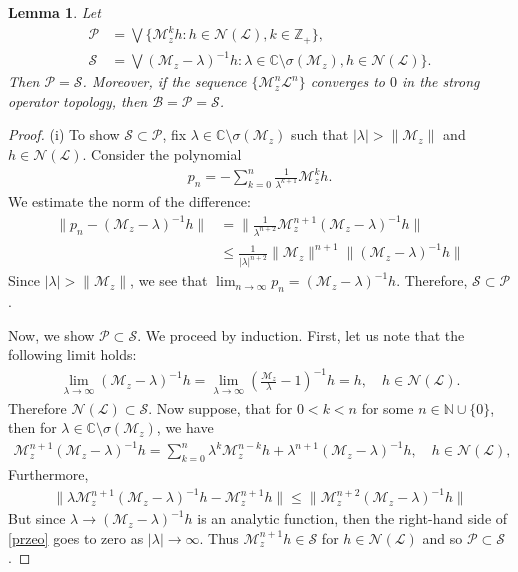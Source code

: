 \documentclass[reqno]{amsproc}
\numberwithin{equation}{section}
\newtheorem{lemma}[theorem]{Lemma}
\theoremstyle{remark}
\newcommand*{\natu}{\mathbb{N}}
\newcommand*{\nul}{\mathscr{N}}
\newcommand*{\comp}{\mathbb{C}}
\theoremstyle{definition}
\newcommand{\lein}{\mathcal{L}}
\newcommand{\mul}{\mathcal{M}_z}
\newcommand{\bspace}{\mathcal{B}}
\newcommand*{\zbb}{\mathbb{Z}}
\begin{document}
\begin{lemma}\label{rpps}
Let 
\begin{align*}
    \mathcal{P}&=\bigvee\{\mul^kh\colon h\in \nul(\lein), k\in \zbb_+\}, \\\mathcal{S}&=\bigvee(\mul-\lambda)^{-1}h\colon \lambda\in \comp\setminus\sigma(\mul),  h\in \nul(\lein)\}.
\end{align*}
 Then $\mathcal{P}=\mathcal{S}$. Moreover, if the sequence $\{\mul^n\lein^n\}$ converges to $0$ in the strong operator topology, then $\bspace=\mathcal{P}=\mathcal{S}$.
\end{lemma}
\begin{proof}
 (i) To show $\mathcal{S}\subset\mathcal{P}$, fix $\lambda \in \comp\setminus\sigma(\mul)$ such that $|\lambda|>\|\mul\|$ and   $h\in \nul(\lein)$. Consider the polynomial 
    \begin{align*}
       p_n=-\sum_{k=0}^n \frac{1}{\lambda^{k+1}}\mul^kh.
    \end{align*}
We estimate the norm of the difference:
    \begin{align*}
        \|p_n-(\mul-\lambda)^{-1}h\|&=\|\frac{1}{\lambda^{n+2}}\mul^{n+1}(\mul-\lambda)^{-1}h\|
        \\&\leq \frac{1}{|\lambda|^{n+2}}\|\mul\|^{n+1}\|(\mul-\lambda)^{-1}h\|
    \end{align*}
    Since $|\lambda|>\|\mul\|$, we see that $\lim_{n\to \infty}p_n=(\mul-\lambda)^{-1}h$. Therefore, $\mathcal{S}\subset\mathcal{P}$.

    
 Now, we show $\mathcal{P}\subset\mathcal{S}$. We proceed by induction. First, let us note that the following limit holds:
\begin{align*}
  \lim_{\lambda\to \infty} (\mul-\lambda)^{-1}h = \lim_{\lambda \to \infty}(\frac{\mul}{\lambda}-1)^{-1}h= h,\quad h\in \nul(\lein).
\end{align*}
Therefore $\nul(\lein)\subset \mathcal{S}$.  Now suppose, that for $0<k<n$ for some $n \in \natu \cup \{0\}$, then for $\lambda \in \comp\setminus\sigma(\mul)$, we have
\begin{align*}
     \mul^{n+1}{(\mul-\lambda)^{-1}}h=\sum_{k=0}^n\lambda^{k}\mul^{n-k}h+\lambda^{n+1}{(\mul-\lambda)^{-1}}h,\quad h\in \nul(\lein), 
\end{align*}
 Furthermore,
\begin{align}\label{przeo}
    \| \lambda\mul^{n+1}{(\mul-\lambda)^{-1}}h-\mul^{n+1}h\|\leq  \| \mul^{n+2}{(\mul-\lambda)^{-1}}h\|
\end{align}
 But since $\lambda\to (\mul-\lambda)^{-1}h$ is an  analytic function, then
 the right-hand side of \eqref{przeo} goes to zero as $|\lambda|\to\infty$. Thus $\mul^{n+1}h\in \mathcal{S}$ for $h\in \nul(\lein)$ and so $\mathcal{P}\subset\mathcal{S}$.


\end{proof}
\end{document}

